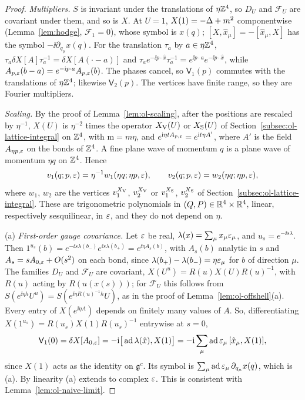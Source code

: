 \begin{proof}
\emph{Multipliers.} $S$ is invariant under the translations of $\eta\mathbb Z^4$, so $D_U$ and $\mathcal F_U$ are covariant under them, and so is $X$. At $U=1$, $X(1)=-\Delta+m^2$ componentwise (Lemma~\ref{lem:hodge}, $\mathcal F_1=0$), whose symbol is $x(q)$; $[X,\hat x_\mu]=-[\hat x_\mu,X]$ has the symbol $-\ii\partial_{q_\mu}x(q)$. For the translation $\tau_a$ by $a\in\eta\mathbb Z^4$, $\tau_a\delta X[A]\tau_a^{-1}=\delta X[A(\cdot-a)]$ and $\tau_ae^{-\ii p\cdot\hat x}\tau_a^{-1}=e^{\ii p\cdot a}e^{-\ii p\cdot\hat x}$, while $A_{p,\varepsilon}(b-a)=e^{-\mathrm i p\cdot a}A_{p,\varepsilon}(b)$. The phases cancel, so $\mathsf V_1(p)$ commutes with the translations of $\eta\mathbb Z^4$; likewise $\mathsf V_2(p)$. The vertices have finite range, so they are Fourier multipliers.

\emph{Scaling.} By the proof of Lemma~\ref{lem:ol-scaling}, after the positions are rescaled by $\eta^{-1}$, $X(U)$ is $\eta^{-2}$ times the operator $X_{\rm V}(U)$ or $X_{\rm S}(U)$ of Section~\ref{subsec:ol-lattice-integral} on $\mathbb Z^4$, with $\mathrm m=m\eta$, and $e^{\mathrm i\eta tA_{p,\varepsilon}}=e^{\mathrm i t\eta A'}$, where $A'$ is the field $A_{\eta p,\varepsilon}$ on the bonds of $\mathbb Z^4$. A fine plane wave of momentum $q$ is a plane wave of momentum $\eta q$ on $\mathbb Z^4$. Hence
\[
v_1(q;p,\varepsilon)=\eta^{-1}w_1(\eta q;\eta p,\varepsilon),\qquad v_2(q;p,\varepsilon)=w_2(\eta q;\eta p,\varepsilon),
\]
where $w_1$, $w_2$ are the vertices $v_1^{X_{\rm V}}$, $v_2^{X_{\rm V}}$ or $v_1^{X_{\rm S}}$, $v_2^{X_{\rm S}}$ of Section~\ref{subsec:ol-lattice-integral}. These are trigonometric polynomials in $(Q,P)\in\mathbb R^4\times\mathbb R^4$, linear, respectively sesquilinear, in $\varepsilon$, and they do not depend on $\eta$.

(a) \emph{First-order gauge covariance.} Let $\varepsilon$ be real, $\lambda(x)=\sum_\mu x_\mu\varepsilon_\mu$, and $u_s=e^{-\ii s\lambda}$. Then $1^{u_s}(b)=e^{-\ii s\lambda(b_-)}e^{\ii s\lambda(b_+)}=e^{\ii\eta A_s(b)}$, with $A_s(b)$ analytic in $s$ and $A_s=sA_{0,\varepsilon}+O(s^2)$ on each bond, since $\lambda(b_+)-\lambda(b_-)=\eta\varepsilon_\mu$ for $b$ of direction $\mu$. The families $D_U$ and $\mathcal F_U$ are covariant, $X(U^u)=R(u)X(U)R(u)^{-1}$, with $R(u)$ acting by $R(u(x(s)))$; for $\mathcal F_U$ this follows from $S(e^{\ii\eta h}U^u)=S(e^{\ii\eta R(u)^{-1}h}U)$, as in the proof of Lemma~\ref{lem:ol-offshell}(a). Every entry of $X(e^{\ii\eta A})$ depends on finitely many values of $A$. So, differentiating $X(1^{u_s})=R(u_s)X(1)R(u_s)^{-1}$ entrywise at $s=0$,
\[
\mathsf V_1(0)=\delta X[A_{0,\varepsilon}]=-\mathrm i\big[\operatorname{ad}\lambda(\hat x),X(1)\big]=-\mathrm i\sum_\mu\operatorname{ad}\varepsilon_\mu\,[\hat x_\mu,X(1)],
\]
since $X(1)$ acts as the identity on $\mathfrak g^c$. Its symbol is $\sum_\mu\operatorname{ad}\varepsilon_\mu\,\partial_{q_\mu}x(q)$, which is (a). By linearity (a) extends to complex $\varepsilon$. This is consistent with Lemma~\ref{lem:ol-naive-limit}.


\end{proof}
